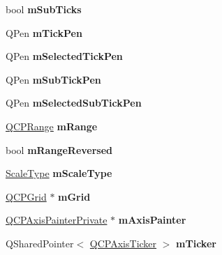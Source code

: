 \begin{DoxyCompactItemize}
bool {\bfseries m\+Sub\+Ticks}
\item 
\mbox{\label{class_q_c_p_axis_a1d52c78c856d8bd1f331d4ec4e63d944}} 
Q\+Pen {\bfseries m\+Tick\+Pen}
\item 
\mbox{\label{class_q_c_p_axis_a9524593dbc75a5c5b29dbd1cb4b37df5}} 
Q\+Pen {\bfseries m\+Selected\+Tick\+Pen}
\item 
\mbox{\label{class_q_c_p_axis_a32ef56d3a417866720eb12667d27dbd1}} 
Q\+Pen {\bfseries m\+Sub\+Tick\+Pen}
\item 
\mbox{\label{class_q_c_p_axis_aa5cc6afc5dc2a365f5abbd36eb04a1dc}} 
Q\+Pen {\bfseries m\+Selected\+Sub\+Tick\+Pen}
\item 
\mbox{\label{class_q_c_p_axis_a1ee36773c49062d751560e11f90845f7}} 
\hyperlink{class_q_c_p_range}{Q\+C\+P\+Range} {\bfseries m\+Range}
\item 
\mbox{\label{class_q_c_p_axis_a5cb034f57aa3d773a9ca55a0931dbf7b}} 
bool {\bfseries m\+Range\+Reversed}
\item 
\mbox{\label{class_q_c_p_axis_ad706039549cbbbec5fcb2baf7894e04d}} 
\hyperlink{class_q_c_p_axis_a36d8e8658dbaa179bf2aeb973db2d6f0}{Scale\+Type} {\bfseries m\+Scale\+Type}
\item 
\mbox{\label{class_q_c_p_axis_a1327b23812c47aed4adcc793ea29c59a}} 
\hyperlink{class_q_c_p_grid}{Q\+C\+P\+Grid} $\ast$ {\bfseries m\+Grid}
\item 
\mbox{\label{class_q_c_p_axis_a6f706c9e9da89c18e94067b859e4f3c7}} 
\hyperlink{class_q_c_p_axis_painter_private}{Q\+C\+P\+Axis\+Painter\+Private} $\ast$ {\bfseries m\+Axis\+Painter}
\item 
\mbox{\label{class_q_c_p_axis_adc991d91b12f6c427bb194473ce18080}} 
Q\+Shared\+Pointer$<$ \hyperlink{class_q_c_p_axis_ticker}{Q\+C\+P\+Axis\+Ticker} $>$ {\bfseries m\+Ticker}
\item 
\mbox{\label{class_q_c_p_axis_a6f231b4ba48570a3ab71d62a7d5ec84c}} 

\end{DoxyCompactItemize}
